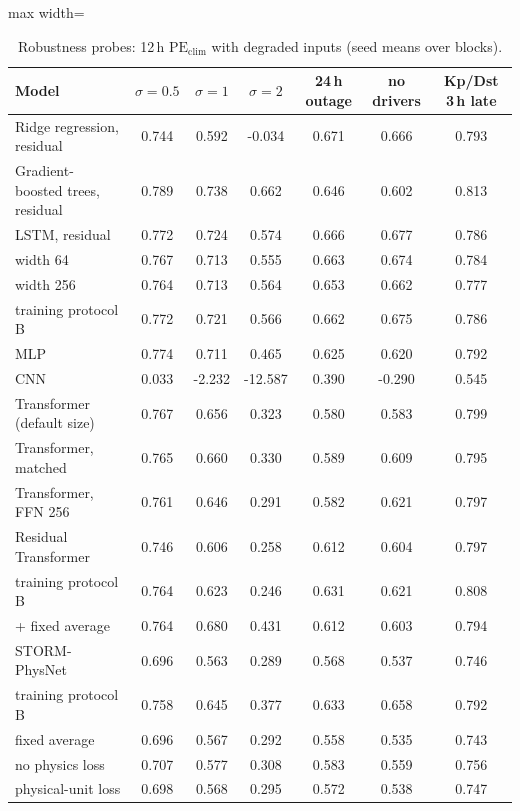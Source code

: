 \begin{table}[!t]
\centering
\caption{Robustness probes: 12\,h $\mathrm{PE}_\mathrm{clim}$ with degraded inputs (seed means over blocks).}
\label{tab:probes}
\footnotesize
\setlength{\tabcolsep}{4pt}
\begin{adjustbox}{max width=\linewidth}
\begin{tabular}{lcccccc}
\toprule
Model & $\sigma=0.5$ & $\sigma=1$ & $\sigma=2$ & 24\,h outage & no drivers & Kp/Dst 3\,h late \\
\midrule
Ridge regression, residual & 0.744 & 0.592 & -0.034 & 0.671 & 0.666 & 0.793 \\
Gradient-boosted trees, residual & 0.789 & 0.738 & 0.662 & 0.646 & 0.602 & 0.813 \\
LSTM, residual & 0.772 & 0.724 & 0.574 & 0.666 & 0.677 & 0.786 \\
\quad width 64 & 0.767 & 0.713 & 0.555 & 0.663 & 0.674 & 0.784 \\
\quad width 256 & 0.764 & 0.713 & 0.564 & 0.653 & 0.662 & 0.777 \\
\quad training protocol B & 0.772 & 0.721 & 0.566 & 0.662 & 0.675 & 0.786 \\
MLP & 0.774 & 0.711 & 0.465 & 0.625 & 0.620 & 0.792 \\
CNN & 0.033 & -2.232 & -12.587 & 0.390 & -0.290 & 0.545 \\
Transformer (default size) & 0.767 & 0.656 & 0.323 & 0.580 & 0.583 & 0.799 \\
Transformer, matched & 0.765 & 0.660 & 0.330 & 0.589 & 0.609 & 0.795 \\
Transformer, FFN 256 & 0.761 & 0.646 & 0.291 & 0.582 & 0.621 & 0.797 \\
Residual Transformer & 0.746 & 0.606 & 0.258 & 0.612 & 0.604 & 0.797 \\
\quad training protocol B & 0.764 & 0.623 & 0.246 & 0.631 & 0.621 & 0.808 \\
\quad + fixed average & 0.764 & 0.680 & 0.431 & 0.612 & 0.603 & 0.794 \\
STORM-PhysNet & 0.696 & 0.563 & 0.289 & 0.568 & 0.537 & 0.746 \\
\quad training protocol B & 0.758 & 0.645 & 0.377 & 0.633 & 0.658 & 0.792 \\
\quad fixed average & 0.696 & 0.567 & 0.292 & 0.558 & 0.535 & 0.743 \\
\quad no physics loss & 0.707 & 0.577 & 0.308 & 0.583 & 0.559 & 0.756 \\
\quad physical-unit loss & 0.698 & 0.568 & 0.295 & 0.572 & 0.538 & 0.747 \\

\end{tabular}
\end{adjustbox}
\end{table}
